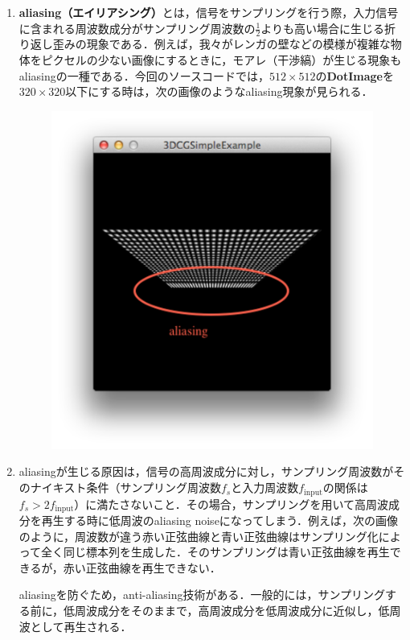 \documentclass[a4paper,11pt]{jsarticle}
\numberwithin{theorem}{section}  %
\numberwithin{equation}{section} %
\begin{document}
\begin{enumerate}
\item
{\bf aliasing（エイリアシング）}とは，信号をサンプリングを行う際，入力信号に含まれる周波数成分がサンプリング周波数の$\frac{1}{2}$よりも高い場合に生じる折り返し歪みの現象である．例えば，我々がレンガの壁などの模様が複雑な物体をピクセルの少ない画像にするときに，モアレ（干渉縞）が生じる現象もaliasingの一種である．今回のソースコードでは，$512\times 512$の{\bf DotImage}を$320\times320$以下にする時は，次の画像のようなaliasing現象が見られる．

\begin{figure}[H]
\includegraphics[bb=0 0 444 451,width=12.5cm]{with_out_mipmapping.pdf}
\end{figure}

\item 
aliasingが生じる原因は，信号の高周波成分に対し，サンプリング周波数がそのナイキスト条件（サンプリング周波数$f_s$と入力周波数$f_{\text{input}}$の関係は$f_s > 2f_{\text{input}}$）に満たさないこと．その場合，サンプリングを用いて高周波成分を再生する時に低周波のaliasing noiseになってしまう．例えば，次の画像のように，周波数が違う赤い正弦曲線と青い正弦曲線はサンプリング化によって全く同じ標本列を生成した．そのサンプリングは青い正弦曲線を再生できるが，赤い正弦曲線を再生できない．

aliasingを防ぐため，anti-aliasing技術がある．一般的には，サンプリングする前に，低周波成分をそのままで，高周波成分を低周波成分に近似し，低周波として再生される．


\end{enumerate}
\end{document}
